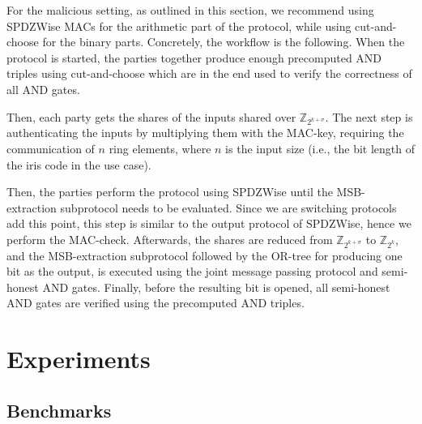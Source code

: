 \documentclass[a4paper,11pt,
]{article}
\newcommand{\Z}{\ensuremath{\mathbb{Z}}\xspace}
\begin{document}
For the malicious setting, as outlined in this section, we recommend using SPDZWise MACs  for the arithmetic part of the protocol, while using cut-and-choose  for the binary parts. Concretely, the workflow is the following. When the protocol is started, the parties together produce enough precomputed AND triples using cut-and-choose which are in the end used to verify the correctness of all AND gates.

Then, each party gets the shares of the inputs shared over $\Z_{2^{k + \sigma}}$. The next step is authenticating the inputs by multiplying them with the MAC-key, requiring the communication of $n$ ring elements, where $n$ is the input size (i.e., the bit length of the iris code in the use case).

Then, the parties perform the protocol using SPDZWise until the MSB-extraction subprotocol needs to be evaluated. Since we are switching protocols add this point, this step is similar to the output protocol of SPDZWise, hence we perform the MAC-check. Afterwards, the shares are reduced from $\Z_{2^{k + \sigma}}$ to $\Z_{2^k}$, and the MSB-extraction subprotocol followed by the OR-tree for producing one bit as the output, is executed using the joint message passing protocol and semi-honest AND gates. Finally, before the resulting bit is opened, all semi-honest AND gates are verified using the precomputed AND triples.


\section{Experiments}

\subsection{Benchmarks}
\end{document}
